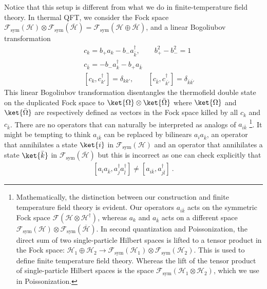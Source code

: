 \documentclass[a4paper,11pt]{article}
\theoremstyle{definition}
\numberwithin{equation}{section}
\newcommand{\nn}{\nonumber}
\begin{document}
Notice that this setup is different from what we do in finite-temperature field theory. 
In thermal QFT, we consider the Fock space $\mathcal{F}_\text{sym}(\mathcal{H})\otimes\mathcal{F}_\text{sym}(\overline{\mathcal{H}}) = \mathcal{F}_\text{sym}(\mathcal{H}\oplus\overline{\mathcal{H}})$, and a linear Bogoliubov transformation 
\begin{eqnarray}
    &&c_k=b_+ a_k-b_- a_{\bar{k}}^\dagger,\qquad b_+^2-b_-^2=1\nn\\
    &&c_{\bar{k}}=-b_-a^\dagger_k-b_+a_{\bar{k}}\nn\\
    &&[c_k,c_{k'}^\dagger]=\delta_{kk'}, \qquad [c_{\bar{k}},c_{\bar{k'}}^\dagger]=\delta_{\bar{k}\bar{k'}}
\end{eqnarray}
This linear Bogoliubov transformation disentangles the thermofield double state on the duplicated Fock space to $\ket{\Omega}\otimes \ket{\bar{\Omega}}$ where $\ket{\Omega}$ and $\ket{\bar{\Omega}}$ are respectively defined as vectors in the Fock space killed by all $c_k$ and $c_{\bar{k}}$. There are no operators that can naturally be interpreted as analogs of $a_{i\bar{k}}$ \footnote{Mathematically, the distinction between our construction and finite temperature field theory is evident. Our operators $a_{i\bar{k}}$ acts on the symmetric Fock space $\mathcal{F}(\mathcal{H}\otimes \mathcal{H}^\dagger)$, whereas $a_k$ and $a_{\bar{k}}$ acts on a different space $\mathcal{F}_\text{sym}(\mathcal{H})\otimes \mathcal{F}_\text{sym}(\overline{\mathcal{H}})$. In second quantization and Poissonization, the direct sum of two single-particle Hilbert spaces is lifted to a tensor product in the Fock space: $\mathcal{H}_1\oplus \mathcal{H}_2\to \mathcal{F}_\text{sym}(\mathcal{H}_1)\otimes \mathcal{F}_\text{sym}(\mathcal{H}_2)$. This is used to define finite temperature field theory. Whereas the lift of the tensor product of single-particle Hilbert spaces is the space $\mathcal{F}_\text{sym}(\mathcal{H}_1\otimes \mathcal{H}_2)$, which we use in Poissonization.}. It might be tempting to think $a_{i\bar{k}}$ can be replaced by bilinears $a_i a_{\bar{k}}$, an operator that annihilates a state $\ket{i}$ in $\mathcal{F}_\text{sym}(\mathcal{H})$ and an operator that annihilates a state $\ket{\bar{k}}$ in $\mathcal{F}_\text{sym}(\overline{\mathcal{H}})$ but this is incorrect as one can check explicitly that 
\begin{eqnarray}\label{TFDannihilatoon}
    [a_ia_{\bar{k}},a^\dagger_j a^\dagger_{\bar{l}}]\neq [a_{i\bar{k}},a^\dagger_{j\bar{l}}] \ .
\end{eqnarray}
\end{document}
